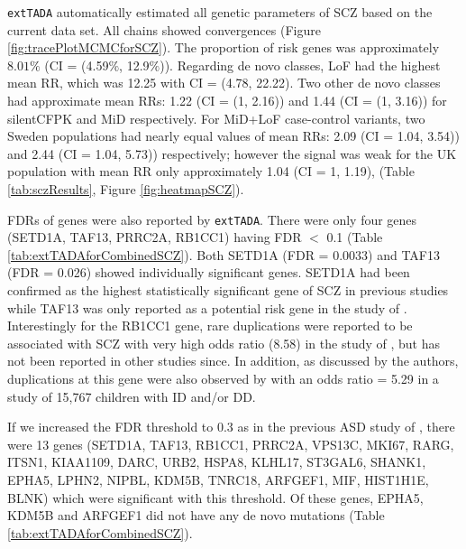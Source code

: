 \documentclass[]{article}
\begin{document}
\texttt{extTADA} automatically estimated all genetic parameters of SCZ based on the
current data set. All chains showed convergences (Figure \ref{fig:tracePlotMCMCforSCZ}). The proportion of risk genes was approximately
$8.01\%$ (CI = (4.59$\%$, 12.9$\%$)). Regarding de novo classes, LoF had the
highest mean RR, which was 12.25 with CI = (4.78, 22.22). Two other
de novo classes had approximate mean RRs: 1.22 (CI = (1, 2.16)) and
1.44 (CI = (1, 3.16)) for silentCFPK and MiD respectively. For MiD+LoF case-control variants, two Sweden populations had
nearly equal values of mean RRs: 2.09 (CI = 1.04, 3.54)) and 2.44 (CI = 1.04, 5.73)) respectively; however the signal was weak for the
UK population with mean RR only approximately 1.04 (CI = 1, 1.19), (Table \ref{tab:sczResults}, Figure \ref{fig:heatmapSCZ}).


FDRs of genes were also reported by \texttt{extTADA}. There were only four genes (SETD1A, TAF13, PRRC2A, RB1CC1) having
FDR $<$ 0.1 (Table \ref{tab:extTADAforCombinedSCZ}). Both SETD1A (FDR = 0.0033) and TAF13 (FDR = 0.026) showed
individually significant genes. SETD1A had been
confirmed as the highest statistically significant gene of SCZ in previous studies \citep{singh2016rare,
  takata2016novo} while TAF13 was only reported as a potential risk
gene in the study of \cite{fromer2014novo}. Interestingly for the
RB1CC1 gene, rare
duplications were reported to be associated with SCZ with very high
odds ratio (8.58) in the study of \cite{degenhardt2013duplications},
but has not been reported in other studies since. In addition, as
discussed by the authors, duplications at this gene were also observed
by \cite{cooper2011copy} with an odds ratio = 5.29 in a study of 15,767 children with
ID and/or DD.

If we increased the FDR threshold to 0.3 as in the previous ASD study of \citet{de2014synaptic}, there were 13 genes (SETD1A, TAF13, RB1CC1, PRRC2A, VPS13C, MKI67, RARG, ITSN1, KIAA1109, DARC, URB2, HSPA8, KLHL17, ST3GAL6, SHANK1, EPHA5, LPHN2, NIPBL, KDM5B, TNRC18, ARFGEF1, MIF, HIST1H1E, BLNK) which were significant with this threshold. Of these genes, EPHA5, KDM5B and ARFGEF1 did not have any de novo mutations (Table \ref{tab:extTADAforCombinedSCZ}).
\end{document}
